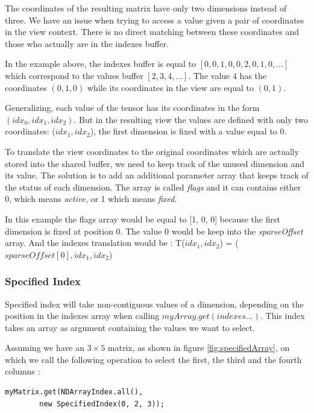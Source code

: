 The coordinates of the resulting matrix have only two dimensions instead of three. We have an issue when trying to access a value given a pair of coordinates in the view context. There is no direct matching between these coordinates and those who actually are in the indexes buffer. 

In the example above, the indexes buffer is equal to $[0, 0, 1, 0, 0, 2, 0, 1, 0, \dots]$ which correspond to the values buffer $[2, 3, 4, \dots]$.
The value $4$ has the coordinates $(0, 1, 0)$ while its coordinates in the view are equal to $(0, 1)$.

Generalizing, each value of the tensor has its coordinates in the form $(idx_{0}, idx_{1}, idx_{2})$. But in the resulting view the values are defined with only two coordinates: ($idx_{1}, idx_{2}$), the first dimension is fixed with a value equal to 0. 

To translate the view coordinates to the original coordinates which are actually stored into the shared buffer, we need to keep track of the unused dimension and its value. The solution is to add an additional parameter array that keeps track of the status of each dimension. The array is called \textit{flags} and it can contains either 0, which means \textit{active}, or 1 which means \textit{fixed}.

In this example the flags array would be equal to [1, 0, 0] because the first dimension is fixed at position 0. The value 0 would be keep into the \textit{sparseOffset} array. And the indexes translation would be : T($idx_{1}, idx_{2}$) = ($sparseOffset[0], idx_{1}, idx_{2}$)


\subsubsection{Specified Index}

Specified index will take non-contiguous values of a dimension, depending on the position in the indexes array when calling $myArray.get(indexes...)$. This index takes an array as argument containing the values we want to select.

Assuming we have an $3\times 5$ matrix, as shown in figure \ref{fig:specifiedArray}, on which we call the following operation to select the first, the third and the fourth columns :

\begin{lstlisting}[style=nonumbers]
	myMatrix.get(NDArrayIndex.all(),
		new SpecifiedIndex(0, 2, 3));
\end{lstlisting}

